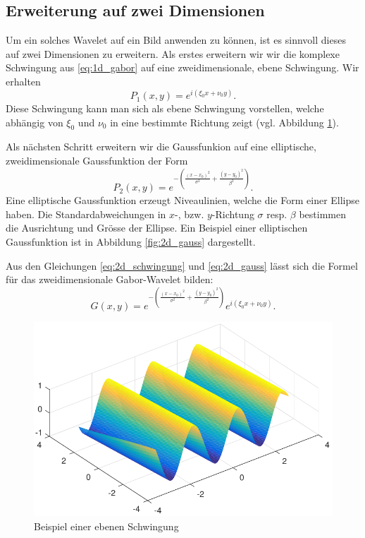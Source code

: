\subsection{Erweiterung auf zwei Dimensionen}\label{subsec:2D}

Um ein solches Wavelet auf ein Bild anwenden zu können, ist es sinnvoll dieses auf zwei Dimensionen zu erweitern.
Als erstes erweitern wir wir die komplexe Schwingung aus \ref{eq:1d_gabor} auf eine zweidimensionale, ebene Schwingung.
Wir erhalten
\begin{equation}\label{eq:2d_schwingung}
P_1(x,y)= e^{i(\xi_{0}x+\nu_{0}y)}.
\end{equation}
Diese Schwingung kann man sich als ebene Schwingung vorstellen, welche abhängig von $\xi_0$ und $\nu_0$ in eine bestimmte Richtung zeigt (vgl. Abbildung \ref{fig:planarwave}).

Als nächsten Schritt erweitern wir die Gaussfunkion auf eine elliptische, zweidimensionale Gaussfunktion der Form
\begin{equation}\label{eq:2d_gauss}
P_2(x,y)=e^{-(\frac{(x-x_{0})^{2}}{\sigma^{2}}+\frac{(y-y_{0})^{2}}{\beta^{2}})}.
\end{equation}
Eine elliptische Gaussfunktion erzeugt Niveaulinien, welche die Form einer Ellipse haben.
Die Standardabweichungen in $x$-, bzw. $y$-Richtung $\sigma$ resp. $\beta$ bestimmen die Ausrichtung und Grösse der Ellipse.
Ein Beispiel einer elliptischen Gaussfunktion ist in Abbildung \ref{fig:2d_gauss} dargestellt.

Aus den Gleichungen \ref{eq:2d_schwingung} und \ref{eq:2d_gauss} lässt sich die Formel für das zweidimensionale Gabor-Wavelet bilden:
\begin{equation}\label{eq:2dgabor1}
G(x,y)= e^{-(\frac{(x-x_{0})^{2}}{\sigma^{2}}+\frac{(y-y_{0})^{2}}{\beta^{2}})}
e^{i(\xi_{0}x+\nu_{0}y)}.
\end{equation}

\begin{figure}
	\centering
	\includegraphics[width=0.7\linewidth]{./papers/visuell/images/planarwave.pdf}
	\caption{Beispiel einer ebenen Schwingung}
	\label{fig:planarwave}
\end{figure}

